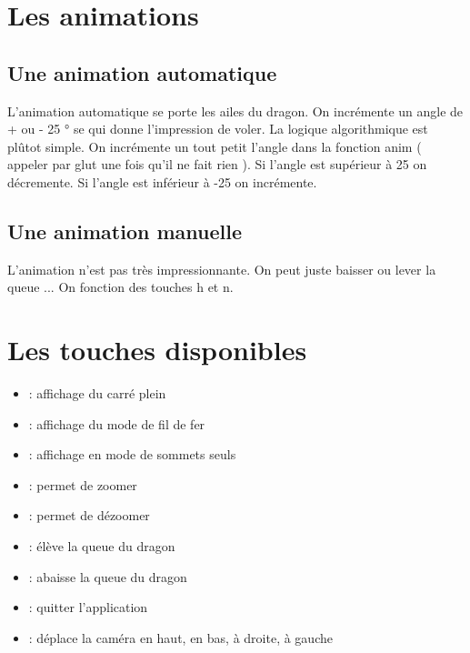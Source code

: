 \documentclass{article}
\begin{document}
\section{Les animations}

\subsection{Une animation automatique}

L'animation automatique se porte les ailes du dragon. On incrémente un angle de + ou - 25 ° se qui donne l'impression de voler. La logique algorithmique est plûtot simple. On incrémente un tout petit l'angle dans la fonction anim ( appeler par glut une fois qu'il ne fait rien ). Si l'angle est supérieur à 25 on décremente. Si l'angle est inférieur à -25 on incrémente. 
 
\subsection{Une animation manuelle}

L'animation n'est pas très impressionnante. On peut juste baisser ou lever la queue ... On fonction des touches h et n.


\section{Les touches disponibles}

\begin{itemize}
\item {}: affichage du carré plein
\item {} : affichage du mode de fil de fer
\item {} : affichage en mode de sommets seuls
\item {} : permet de zoomer
\item {} : permet de dézoomer 
\item {} : élève la queue du dragon
\item {} : abaisse la queue du dragon 
\item {} : quitter l'application 
\item \UArrow \DArrow \LArrow \RArrow : déplace la caméra en haut, en bas, à droite, à gauche

\end{itemize}

\end{document}
